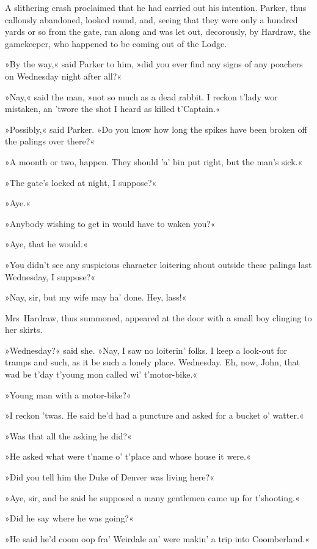 A slithering crash proclaimed that he had carried out his intention.  Parker, thus callously abandoned, looked round, and, seeing that they were only a hundred yards or so from the gate, ran along and was let out, decorously, by Hardraw, the gamekeeper, who happened to be coming out of the Lodge.

»By the way,« said Parker to him, »did you ever find any signs of any poachers on Wednesday night after all?«

»Nay,« said the man, »not so much as a dead rabbit. I reckon t'lady wor mistaken, an 'twore the shot I heard as killed t'Captain.«

»Possibly,« said Parker. »Do you know how long the spikes have been broken off the palings over there?«

»A moonth or two, happen. They should 'a' bin put right, but the man's sick.«

»The gate's locked at night, I suppose?«

»Aye.«

»Anybody wishing to get in would have to waken you?«

»Aye, that he would.«

»You didn't see any suspicious character loitering about outside these palings last Wednesday, I suppose?«

»Nay, sir, but my wife may ha' done. Hey, lass!«

Mrs~Hardraw, thus summoned, appeared at the door with a small boy clinging to her skirts.

»Wednesday?« said she. »Nay, I saw no loiterin' folks. I keep a look-out for tramps and such, as it be such a lonely place. Wednesday.  Eh, now, John, that wad be t'day t'young mon called wi' t'motor-bike.«

»Young man with a motor-bike?«

»I reckon 'twas. He said he'd had a puncture and asked for a bucket o' watter.«

»Was that all the asking he did?«

»He asked what were t'name o' t'place and whose house it were.«

»Did you tell him the Duke of Denver was living here?«

»Aye, sir, and he said he supposed a many gentlemen came up for t'shooting.«

»Did he say where he was going?«

»He said he'd coom oop fra' Weirdale an' were makin' a trip into Coomberland.«


